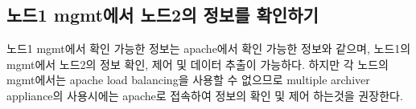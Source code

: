 \documentclass[11pt
  , a4paper
  , article
  , oneside
]{memoir}
\begin{document}
\subsection{노드1 mgmt에서 노드2의 정보를 확인하기}
노드1 mgmt에서 확인 가능한 정보는 apache에서 확인 가능한 정보와 같으며, 노드1의 mgmt에서 노드2의 정보 확인, 제어 및 데이터 추출이 가능하다. 하지만 각 노드의 mgmt에서는 apache load balancing을 사용할 수 없으므로 multiple archiver appliance의 사용시에는 apache로 접속하여 정보의 확인 및 제어 하는것을 권장한다.
\\\\
\begin{figure}[!htb]
	\centering
	
	\hfill
	\hfill
\end{figure}
\clearpage
\end{document}
